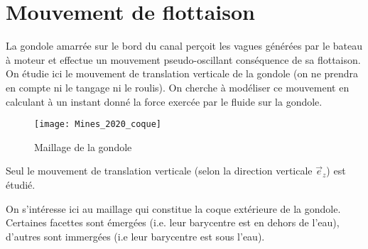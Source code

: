 \newpage
\section{Mouvement de flottaison} 
La gondole amarrée sur le bord du canal perçoit les vagues générées par le bateau à moteur et effectue un mouvement pseudo-oscillant conséquence de sa flottaison. On étudie ici le mouvement de translation verticale de la gondole (on ne prendra en compte ni le tangage ni le roulis). On cherche à modéliser ce mouvement en calculant à un instant donné la force exercée par le fluide sur la gondole.
\begin{figure}[ht]
\begin{center}
\texttt{[image: Mines\_2020\_coque]}
\caption{Maillage de la gondole}
\end{center}
\end{figure}

Seul le mouvement de translation verticale (selon la direction verticale $\vec e_z$) est étudié.

On s’intéresse ici au maillage qui constitue la coque extérieure de la gondole. Certaines facettes sont émergées (i.e. leur barycentre est en dehors de l’eau), d’autres sont immergées (i.e leur barycentre est sous l’eau).

